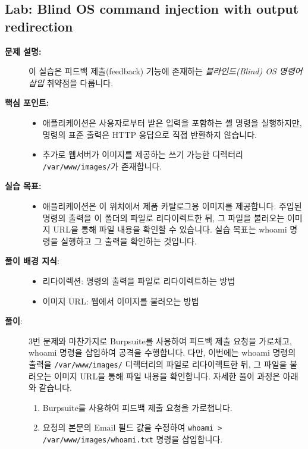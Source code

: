 \documentclass{article}
\begin{document}
\subsection*{Lab: Blind OS command injection with output redirection}
\begin{description}
  \item[\textbf{문제 설명:}] 이 실습은 피드백 제출(feedback) 기능에 존재하는 \emph{블라인드(Blind) OS 명령어 삽입} 취약점을 다룹니다.  
  \item[\textbf{핵심 포인트:}]\leavevmode\par
    \begin{itemize}
      \item 애플리케이션은 사용자로부터 받은 입력을 포함하는 셸 명령을 실행하지만, 명령의 표준 출력은 HTTP 응답으로 직접 반환하지 않습니다.  
      \item 추가로 웹서버가 이미지를 제공하는 쓰기 가능한 디렉터리 \texttt{/var/www/images/}가 존재합니다.
    \end{itemize}

  \item[\textbf{실습 목표:}]\leavevmode\par
    \begin{itemize}
      \item 애플리케이션은 이 위치에서 제품 카탈로그용 이미지를 제공합니다. 
      주입된 명령의 출력을 이 폴더의 파일로 리다이렉트한 뒤, 그 파일을 불러오는 이미지 URL을 통해 파일 내용을 확인할 수 있습니다.
      실습 목표는 whoami 명령을 실행하고 그 출력을 확인하는 것입니다.
    \end{itemize}

  \item[\textbf{풀이 배경 지식}:]\leavevmode\par
    \begin{itemize}
      \item 리다이렉션: 명령의 출력을 파일로 리다이렉트하는 방법
      \item 이미지 URL: 웹에서 이미지를 불러오는 방법
    \end{itemize}

  \item[\textbf{풀이}:] \leavevmode\par
    3번 문제와 마찬가지로 Burpsuite를 사용하여 피드백 제출 요청을 가로채고, whoami 명령을 삽입하여 공격을 수행합니다.
    다만, 이번에는 whoami 명령의 출력을 \texttt{/var/www/images/} 디렉터리의 파일로 리다이렉트한 뒤, 
    그 파일을 불러오는 이미지 URL을 통해 파일 내용을 확인합니다.
    자세한 풀이 과정은 아래와 같습니다.
  \begin{enumerate}
    \item Burpsuite를 사용하여 피드백 제출 요청을 가로챕니다.
    \item 요청의 본문의 Email 필드 값을 수정하여 \texttt{whoami > /var/www/images/whoami.txt} 명령을 삽입합니다.
    

\end{enumerate}
\end{description}
\end{document}
